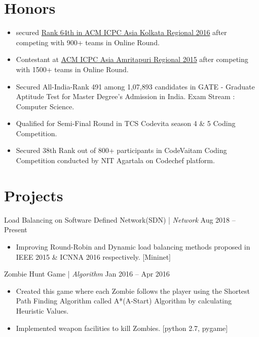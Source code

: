 \documentclass{res}
\begin{document}
\begin{resume}
\section{{\Large Honors}} 
\vspace{15pt}
\begin{itemize}
\item secured \underline{Rank 64th in ACM ICPC Asia Kolkata Regional 2016} after competing with 900+ teams in Online Round.
\item Contestant at \underline{ACM ICPC Asia Amritapuri Regional 2015} after competing with 1500+ teams in Online Round.
\item Secured All-India-Rank 491 among 1,07,893 candidates in GATE - Graduate Aptitude Test for Master Degree's Admission in India. Exam Stream : Computer Science.
\item Qualified for Semi-Final Round in TCS Codevita season 4 \& 5 Coding Competition.
\item Secured 38th Rank out of 800+ participants in CodeVaitam Coding Competition conducted by NIT Agartala on Codechef platform.
\end{itemize}

\vspace{0.01in} 
\section{{\Large Projects}} 
\vspace{8pt} %

{\sc Load Balancing on Software Defined Network(SDN)} | {\it Network} \hfill Aug 2018 -- Present
\begin{itemize}
\item Improving Round-Robin and Dynamic load balancing methods proposed in IEEE 2015 \& ICNNA 2016 respectively. [Mininet]
\end{itemize}

{\sc Zombie Hunt Game} | {\it Algorithm} \hfill Jan 2016 -- Apr 2016
\begin{itemize}
\item Created this game where each Zombie follows the player using the Shortest Path Finding Algorithm called A*(A-Start) Algorithm by calculating Heuristic Values.
\item Implemented weapon facilities to kill Zombies. [python 2.7, pygame]
\end{itemize}


\end{resume}
\end{document}
